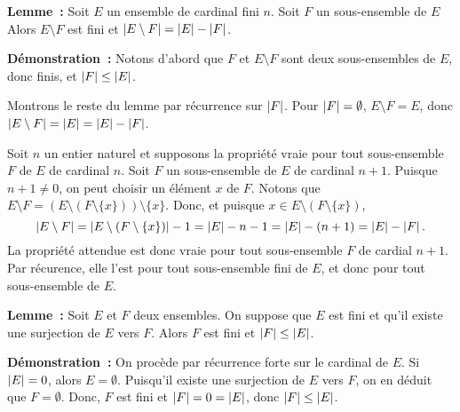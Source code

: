     \done

\medskip

\noindent\textbf{Lemme :} Soit $E$ un ensemble de cardinal fini $n$. 
    Soit $F$ un sous-ensemble de $E$
    Alors $E \setminus F$ est fini et $\left\lvert E \setminus F \right\rvert = \left\lvert E \right\rvert - \left\lvert F \right\rvert$.

\medskip

\noindent\textbf{Démonstration :} Notons d'abord que $F$ et $E \setminus F$ sont deux sous-ensembles de $E$, donc finis, et $\left\lvert F \right\rvert \leq \left\lvert E \right\rvert$.

    Montrons le reste du lemme par récurrence sur $\left\lvert F \right\rvert$.
    Pour $\left\lvert F \right\rvert = \emptyset$, $E \setminus F = E$, donc $\left\lvert E \setminus F \right\rvert = \left\lvert E \right\rvert = \left\lvert E \right\rvert - \left\lvert F \right\rvert$. 

    Soit $n$ un entier naturel et supposons la propriété vraie pour tout sous-ensemble $F$ de $E$ de cardinal $n$. 
    Soit $F$ un sous-ensemble de $E$ de cardinal $n+1$. 
    Puisque $n+1 \neq 0$, on peut choisir un élément $x$ de $F$. 
    Notons que $E \setminus F = \left( E \setminus \left( F \setminus \lbrace x \rbrace \right) \right) \setminus \lbrace x \rbrace$.
    Donc, et puisque $x \in E \setminus \left( F \setminus \lbrace x \rbrace \right)$, 
    \begin{equation*}
        \left\lvert E \setminus F \right\rvert = \left\lvert E \setminus \left( F \setminus \lbrace x \rbrace \right) \right\rvert - 1
                            = \left\lvert E \right\rvert - n - 1
                            = \left\lvert E \right\rvert - (n+1)
                            = \left\lvert E \right\rvert - \left\lvert F \right\rvert.
    \end{equation*}
    La propriété attendue est donc vraie pour tout sous-ensemble $F$ de cardial $n+1$. 
    Par récurence, elle l'est pour tout sous-ensemble fini de $E$, et donc pour tout sous-ensemble de $E$.

    \done

\medskip

\noindent\textbf{Lemme :} Soit $E$ et $F$ deux ensembles. 
    On suppose que $E$ est fini et qu'il existe une surjection de $E$ vers $F$.
    Alors $F$ est fini et $\left\lvert F \right\rvert \leq \left\lvert E \right\rvert$.

\medskip

\noindent\textbf{Démonstration :} On procède par récurrence forte sur le cardinal de $E$. 
    Si $\left\lvert E \right\rvert = 0$, alors $E = \emptyset$. 
    Puisqu'il existe une surjection de $E$ vers $F$, on en déduit que $F = \emptyset$. 
    Donc, $F$ est fini et $\left\lvert F \right\rvert = 0 = \left\lvert E \right\rvert$, donc $\left\lvert F \right\rvert \leq \left\lvert E \right\rvert$.


